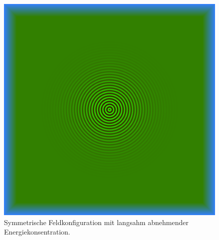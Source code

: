 \begin{figure}
    \includegraphics{papers/particles/figures/wavesim/particle_initial_state.png}
    \caption{Symmetrische Feldkonfiguration mit langsahm abnehmender Energiekonsentration.\ }\label{particles:fig:partikel:abnehmen:symmetrisch}
\end{figure}
